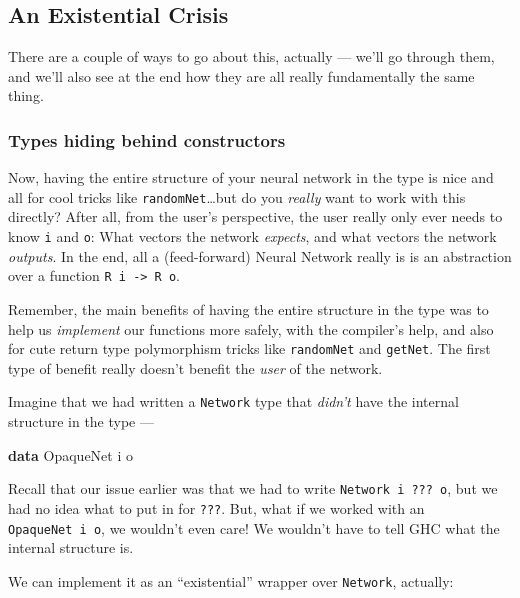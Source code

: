 \documentclass[]{article}
\newenvironment{Shaded}{}{}
\newcommand{\KeywordTok}[1]{\textcolor[rgb]{0.00,0.44,0.13}{\textbf{{#1}}}}
\newcommand{\DataTypeTok}[1]{\textcolor[rgb]{0.56,0.13,0.00}{{#1}}}
\newcommand{\NormalTok}[1]{{#1}}
\begin{document}
\subsection{An Existential Crisis}\label{an-existential-crisis}

There are a couple of ways to go about this, actually --- we'll go through them,
and we'll also see at the end how they are all really fundamentally the same
thing.

\subsubsection{Types hiding behind
constructors}\label{types-hiding-behind-constructors}

Now, having the entire structure of your neural network in the type is nice and
all for cool tricks like \texttt{randomNet}\ldots{}but do you \emph{really} want
to work with this directly? After all, from the user's perspective, the user
really only ever needs to know \texttt{i} and \texttt{o}: What vectors the
network \emph{expects}, and what vectors the network \emph{outputs}. In the end,
all a (feed-forward) Neural Network really is is an abstraction over a function
\texttt{R\ i\ -\textgreater{}\ R\ o}.

Remember, the main benefits of having the entire structure in the type was to
help us \emph{implement} our functions more safely, with the compiler's help,
and also for cute return type polymorphism tricks like \texttt{randomNet} and
\texttt{getNet}. The first type of benefit really doesn't benefit the
\emph{user} of the network.

Imagine that we had written a \texttt{Network} type that \emph{didn't} have the
internal structure in the type ---

\begin{Shaded}
\begin{Highlighting}[]
\KeywordTok{data} \DataTypeTok{OpaqueNet} \NormalTok{i o}
\end{Highlighting}
\end{Shaded}

Recall that our issue earlier was that we had to write
\texttt{Network\ i\ ???\ o}, but we had no idea what to put in for \texttt{???}.
But, what if we worked with an \texttt{OpaqueNet\ i\ o}, we wouldn't even care!
We wouldn't have to tell GHC what the internal structure is.

We can implement it as an ``existential'' wrapper over \texttt{Network},
actually:
\end{document}
